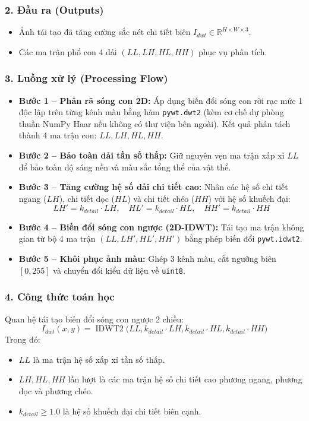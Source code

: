 \subsubsection*{2. Đầu ra (Outputs)}
\begin{itemize}
    \item Ảnh tái tạo đã tăng cường sắc nét chi tiết biên $I_{dwt} \in \mathbb{R}^{H \times W \times 3}$.
    \item Các ma trận phổ con 4 dải $(LL, LH, HL, HH)$ phục vụ phân tích.
\end{itemize}

\subsubsection*{3. Luồng xử lý (Processing Flow)}
\begin{itemize}
    \item \textbf{Bước 1 -- Phân rã sóng con 2D:} Áp dụng biến đổi sóng con rời rạc mức 1 độc lập trên từng kênh màu bằng hàm \texttt{pywt.dwt2} (kèm cơ chế dự phòng thuần NumPy Haar nếu không có thư viện bên ngoài). Kết quả phân tách thành 4 ma trận con: $LL, LH, HL, HH$.
    \item \textbf{Bước 2 -- Bảo toàn dải tần số thấp:} Giữ nguyên vẹn ma trận xấp xỉ $LL$ để bảo toàn độ sáng nền và màu sắc tổng thể của vật thể.
    \item \textbf{Bước 3 -- Tăng cường hệ số dải chi tiết cao:} Nhân các hệ số chi tiết ngang ($LH$), chi tiết dọc ($HL$) và chi tiết chéo ($HH$) với hệ số khuếch đại:
    $$LH' = k_{detail} \cdot LH, \quad HL' = k_{detail} \cdot HL, \quad HH' = k_{detail} \cdot HH$$
    \item \textbf{Bước 4 -- Biến đổi sóng con ngược (2D-IDWT):} Tái tạo ma trận không gian từ bộ 4 ma trận $(LL, LH', HL', HH')$ bằng phép biến đổi \texttt{pywt.idwt2}.
    \item \textbf{Bước 5 -- Khôi phục ảnh màu:} Ghép 3 kênh màu, cắt ngưỡng biên $[0, 255]$ và chuyển đổi kiểu dữ liệu về \texttt{uint8}.
\end{itemize}

\subsubsection*{4. Công thức toán học}
Quan hệ tái tạo biến đổi sóng con ngược 2 chiều:
\begin{equation}
    I_{dwt}(x, y) = \operatorname{IDWT2}\Big(LL, k_{detail} \cdot LH, k_{detail} \cdot HL, k_{detail} \cdot HH\Big)
\end{equation}
Trong đó:
\begin{itemize}
    \item $LL$ là ma trận hệ số xấp xỉ tần số thấp.
    \item $LH, HL, HH$ lần lượt là các ma trận hệ số chi tiết cao phương ngang, phương dọc và phương chéo.
    \item $k_{detail} \ge 1.0$ là hệ số khuếch đại chi tiết biên cạnh.
\end{itemize}

